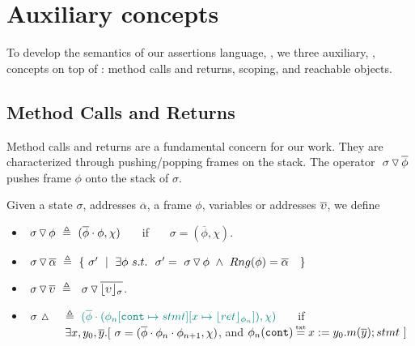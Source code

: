 {\section{Auxiliary concepts}
\label{s:auxiliary}

{To develop the semantics of our assertions language, \AssertLang, we    three auxiliary, , concepts on  top of  \LangOO: {method calls and returns, scoping}, and reachable objects.}

\subsection{ Method Calls and Returns}

 
 
Method calls and returns are a fundamental concern for our work. 
They are characterized through pushing/popping   frames on the stack.  
The operator   $  \ {\sigma} \, {\triangledown}\, \overline{\phi} $ pushes 
frame $\phi$ onto the stack of $\sigma$.
 
 

\begin{definition}
\label{def:push:frame}
Given a state $\sigma$, addresses $\overline \alpha$, a frame $\phi$,  variables or addresses $\overline {\upsilon}$, we define
\begin{itemize}
\item
 $  \ {\sigma} \, {\triangledown}\, {\phi}  \ \triangleq \ ({\overline{\phi}\cdot\phi}, \chi)$ \ \ \  if \ \ \  $\sigma=(\overline{\phi}, \chi)$.
\item
$ \PushS  {\alpha} {\sigma} \ \triangleq\ \{ \ \sigma' \ \mid\ \exists \phi  \ s.t.\ \ 
   \sigma'=\PushSF  {\phi} {\sigma}  \ \wedge\    Rng(\phi)=\overline \alpha \ \   \ \}$
\item
{$  \ {\sigma} \, {\triangledown}\, \overline{\upsilon} \  \triangleq\      \ {\sigma} \, {\triangledown}\, \overline{\lfloor \upsilon \rfloor_{\sigma}}  $.}
\item
$ \ \sigma\, \popSymbol \ \ \  \triangleq\   \sdN{ (\overline{\phi}\cdot (\phi_n[\prg{cont}\mapsto stmt][x \mapsto \interpret {\phi_n}{ret}]), \chi)}$ \ \ \  if \\
 $\strut \hspace{1.2cm}  \exists x, y_0, \overline y. [ \ \sigma=(\overline{\phi}\cdot\phi_n\cdot\phi_{n+1}, \chi)$, and $\phi_n(\prg{cont})\txteq x:= y_0.m(\overline y); stmt \ ]$
\end{itemize}
 \end{definition}

}

